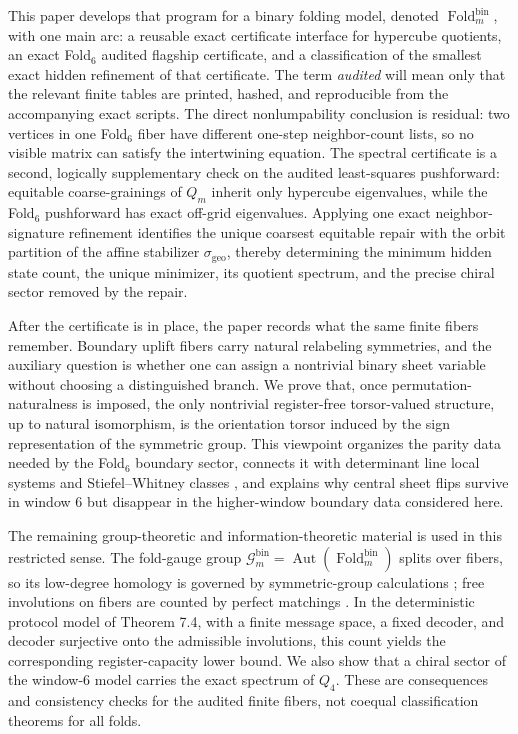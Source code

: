 \documentclass[12pt,a4paper]{article}
\theoremstyle{plain}
\theoremstyle{definition}
\numberwithin{equation}{section}
\DeclareMathOperator{\Aut}{Aut}
\newcommand{\Fold}{\operatorname{Fold}}
\begin{document}
This paper develops that program for a binary folding model, denoted \(\Fold_m^{\mathrm{bin}}\), with one main arc: a reusable exact certificate interface for hypercube quotients, an exact Fold\(_6\) audited flagship certificate, and a classification of the smallest exact hidden refinement of that certificate.  The term \emph{audited} will mean only that the relevant finite tables are printed, hashed, and reproducible from the accompanying exact scripts.  The direct nonlumpability conclusion is residual: two vertices in one Fold\(_6\) fiber have different one-step neighbor-count lists, so no visible matrix can satisfy the intertwining equation.  The spectral certificate is a second, logically supplementary check on the audited least-squares pushforward: equitable coarse-grainings of \(Q_m\) inherit only hypercube eigenvalues, while the Fold\(_6\) pushforward has exact off-grid eigenvalues.  Applying one exact neighbor-signature refinement identifies the unique coarsest equitable repair with the orbit partition of the affine stabilizer \(\sigma_{\mathrm{geo}}\), thereby determining the minimum hidden state count, the unique minimizer, its quotient spectrum, and the precise chiral sector removed by the repair.

After the certificate is in place, the paper records what the same finite fibers remember.  Boundary uplift fibers carry natural relabeling symmetries, and the auxiliary question is whether one can assign a nontrivial binary sheet variable without choosing a distinguished branch. We prove that, once permutation-naturalness is imposed, the only nontrivial register-free torsor-valued structure, up to natural isomorphism, is the orientation torsor induced by the sign representation of the symmetric group. This viewpoint organizes the parity data needed by the Fold\(_6\) boundary sector, connects it with determinant line local systems and Stiefel--Whitney classes \cite{milnor1974characteristic,hatcher2002algebraic}, and explains why central sheet flips survive in window \(6\) but disappear in the higher-window boundary data considered here.

The remaining group-theoretic and information-theoretic material is used in this restricted sense. The fold-gauge group \(\mathcal G_m^{\mathrm{bin}}=\Aut(\Fold_m^{\mathrm{bin}})\) splits over fibers, so its low-degree homology is governed by symmetric-group calculations \cite{brown1982cohomology,nakaoka1961homology}; free involutions on fibers are counted by perfect matchings \cite{stanley2012enumerative}. In the deterministic protocol model of Theorem 7.4, with a finite message space, a fixed decoder, and decoder surjective onto the admissible involutions, this count yields the corresponding register-capacity lower bound.  We also show that a chiral sector of the window-\(6\) model carries the exact spectrum of \(Q_4\).  These are consequences and consistency checks for the audited finite fibers, not coequal classification theorems for all folds.
\end{document}
